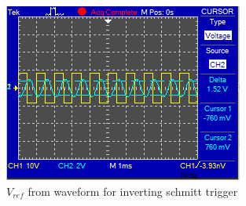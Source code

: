 \documentclass[a4paper, 12pt, english]{article}
\newenvironment{Figure}
  {\par\medskip\noindent\minipage{\linewidth}}
  {\endminipage\par\medskip}
\newlength{\simheight}
\newlength{\vrefheight}
\begin{document}

\begin{figure}[H]
    \centering
    \includegraphics[width=\linewidth, height=\simheight]{images/Inverting-Schmitt-Trigger-Vref-Cursor.png}
    \caption{$V_{ref}$ from waveform for inverting schmitt trigger}
    \label{fig:$V_{ref}$ from waveform for inverting schmitt trigger}
\end{figure}
\end{document}
